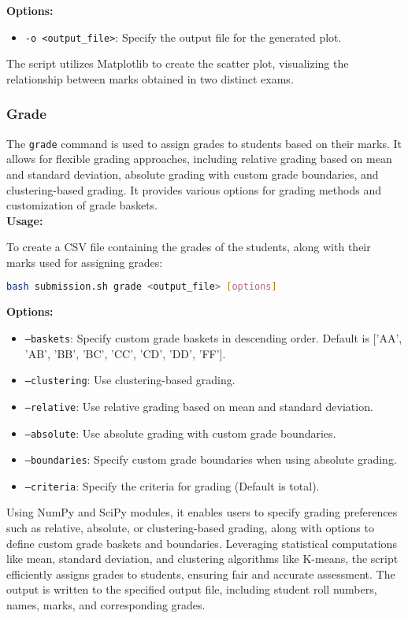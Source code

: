 \documentclass{article}
\begin{document}
\textbf{Options:}
\begin{itemize}
    \item \texttt{-o <output\_file>}: Specify the output file for the generated plot.
\end{itemize}

The script utilizes Matplotlib to create the scatter plot, visualizing the relationship between marks obtained in two distinct exams. 

\subsubsection{Grade}
The \texttt{grade} command is used to assign grades to students based on their marks. It allows for flexible grading approaches, including relative grading based on mean and standard deviation, absolute grading with custom grade boundaries, and clustering-based grading. It provides various options for grading methods and customization of grade baskets.\\
\textbf{Usage:}
\begin{adjustwidth}{0.5cm}{0cm}
To create a CSV file containing the grades of the students, along with their marks used for assigning grades:
\begin{lstlisting}[language=bash]
bash submission.sh grade <output_file> [options]
\end{lstlisting}
\end{adjustwidth}

\textbf{Options:}
\begin{itemize}
    \item \texttt{--baskets}: Specify custom grade baskets in descending order. Default is ['AA', 'AB', 'BB', 'BC', 'CC', 'CD', 'DD', 'FF'].
    \item \texttt{--clustering}: Use clustering-based grading.
    \item \texttt{--relative}: Use relative grading based on mean and standard deviation.
    \item \texttt{--absolute}: Use absolute grading with custom grade boundaries.
    \item \texttt{--boundaries}: Specify custom grade boundaries when using absolute grading.
    \item \texttt{--criteria}: Specify the criteria for grading (Default is total).
\end{itemize}

Using NumPy and SciPy modules, it enables users to specify grading preferences such as relative, absolute, or clustering-based grading, along with options to define custom grade baskets and boundaries. Leveraging statistical computations like mean, standard deviation, and clustering algorithms like K-means, the script efficiently assigns grades to students, ensuring fair and accurate assessment. The output is written to the specified output file, including student roll numbers, names, marks, and corresponding grades.
\end{document}
